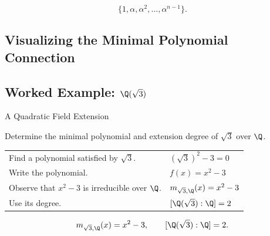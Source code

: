 \[ \{1,\alpha,\alpha^2,\ldots,\alpha^{n-1}\}. \]

\subsection{Visualizing the Minimal Polynomial Connection}
\label{subsec:visual-minimal-polynomial}

\begin{center}
\end{center}

\subsection{Worked Example: \(\Q(\sqrt3)\)}
\label{subsec:worked-q-sqrt3}

\begin{workedexamplebox}{A Quadratic Field Extension}

Determine the minimal polynomial and extension degree of \(\sqrt3\) over
\(\Q\).

\begin{tabularx}{\textwidth}{@{}>{\raggedright\arraybackslash}p{}X@{}}
Find a polynomial satisfied by \(\sqrt3\). & \((\sqrt3)^2-3=0\)\\
Write the polynomial. & \(f(x)=x^2-3\)\\
Observe that \(x^2-3\) is irreducible over \(\Q\). & \(m_{\sqrt3,\Q}(x)=x^2-3\)\\
Use its degree. & \([\Q(\sqrt3):\Q]=2\)
\end{tabularx}

\begin{answerbox}
\[ m_{\sqrt3,\Q}(x)=x^2-3,\qquad[\Q(\sqrt3):\Q]=2. \]
\end{answerbox}
\end{workedexamplebox}


